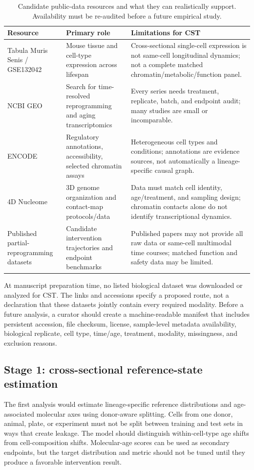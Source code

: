 \documentclass[11pt,a4paper]{article}
\theoremstyle{definition}
\theoremstyle{remark}
\begin{document}
\begin{table}[htbp]
\centering
\caption{Candidate public-data resources and what they can realistically support. Availability must be re-audited before a future empirical study.}
\begin{tabularx}{\textwidth}{p{}p{}X}
\toprule
Resource & Primary role & Limitations for CST \\
\midrule
Tabula Muris Senis / GSE132042 & Mouse tissue and cell-type expression across lifespan \cite{TabulaMuris2020} & Cross-sectional single-cell expression is not same-cell longitudinal dynamics; not a complete matched chromatin/metabolic/function panel. \\
NCBI GEO & Search for time-resolved reprogramming and aging transcriptomics & Every series needs treatment, replicate, batch, and endpoint audit; many studies are small or incomparable. \\
ENCODE & Regulatory annotations, accessibility, selected chromatin assays & Heterogeneous cell types and conditions; annotations are evidence sources, not automatically a lineage-specific causal graph. \\
4D Nucleome & 3D genome organization and contact-map protocols/data & Data must match cell identity, age/treatment, and sampling design; chromatin contacts alone do not identify transcriptional dynamics. \\
Published partial-reprogramming datasets & Candidate intervention trajectories and endpoint benchmarks \cite{Ocampo2016,Lu2020,Browder2022} & Published papers may not provide all raw data or same-cell multimodal time courses; matched function and safety data may be limited. \\
\bottomrule
\end{tabularx}
\end{table}

At manuscript preparation time, no listed biological dataset was downloaded or analyzed for CST. The links and accessions specify a proposed route, not a declaration that these datasets jointly contain every required modality. Before a future analysis, a curator should create a machine-readable manifest that includes persistent accession, file checksum, license, sample-level metadata availability, biological replicate, cell type, time/age, treatment, modality, missingness, and exclusion reasons.

\subsection{Stage 1: cross-sectional reference-state estimation}
The first analysis would estimate lineage-specific reference distributions and age-associated molecular axes using donor-aware splitting. Cells from one donor, animal, plate, or experiment must not be split between training and test sets in ways that create leakage. The model should distinguish within-cell-type age shifts from cell-composition shifts. Molecular-age scores can be used as secondary endpoints, but the target distribution and metric should not be tuned until they produce a favorable intervention result.
\end{document}
